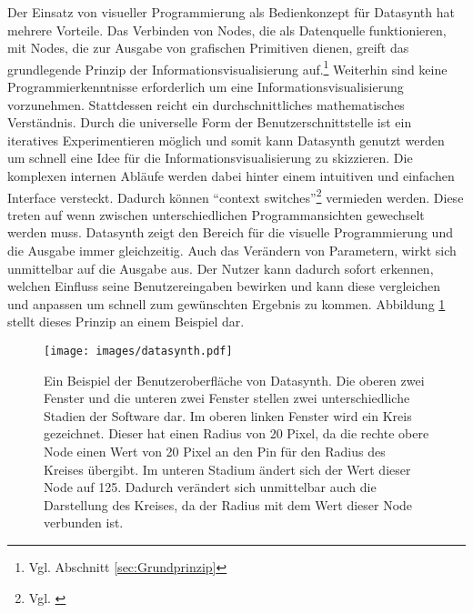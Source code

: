 \documentclass[a4paper, 12pt, DIVcalc, onepage, pdftex, headsepline, footsepline]{scrreprt}
\begin{document}
Der Einsatz von visueller Programmierung als Bedienkonzept für Datasynth hat
mehrere Vorteile. Das Verbinden von Nodes, die als Datenquelle funktionieren, mit Nodes, die
zur Ausgabe von grafischen Primitiven dienen, greift das grundlegende
Prinzip der Informationsvisualisierung auf.\footnote{Vgl. Abschnitt \ref{sec:Grundprinzip}}
Weiterhin sind keine Programmierkenntnisse erforderlich um eine Informationsvisualisierung
vorzunehmen. Stattdessen reicht ein durchschnittliches mathematisches Verständnis.
Durch die universelle Form der Benutzerschnittstelle ist ein iteratives
Experimentieren möglich und somit kann Datasynth genutzt werden um schnell eine
Idee für die Informationsvisualisierung zu skizzieren.
Die komplexen internen Abläufe werden dabei hinter einem intuitiven und einfachen Interface
versteckt. Dadurch können "`context switches"'\footnote{Vgl. \citep[S.\,50]{Tufte}}
vermieden werden. Diese treten auf wenn zwischen unterschiedlichen Programmansichten gewechselt
werden muss. Datasynth zeigt den Bereich für die visuelle Programmierung und die Ausgabe
immer gleichzeitig. Auch das Verändern von Parametern, wirkt sich unmittelbar auf die Ausgabe
aus. Der Nutzer kann dadurch sofort erkennen, welchen Einfluss seine Benutzereingaben bewirken und
kann diese vergleichen und anpassen um schnell zum gewünschten Ergebnis zu kommen.
Abbildung \ref{fig:datasynth} stellt dieses Prinzip an einem Beispiel dar.
\begin{figure}
\centering
\texttt{[image: images/datasynth.pdf]}
\caption{Ein Beispiel der Benutzeroberfläche von Datasynth. Die oberen zwei Fenster und
die unteren zwei Fenster stellen zwei unterschiedliche Stadien der Software dar.
Im oberen linken Fenster wird ein Kreis gezeichnet. Dieser hat einen Radius von 20 Pixel, da
die rechte obere Node einen Wert von 20 Pixel an den Pin für den Radius des Kreises übergibt.
Im unteren Stadium ändert sich der Wert dieser Node auf 125. Dadurch verändert sich unmittelbar
auch die Darstellung des Kreises, da der Radius mit dem Wert dieser Node verbunden ist.}
\label{fig:datasynth}
\end{figure}
\end{document}
